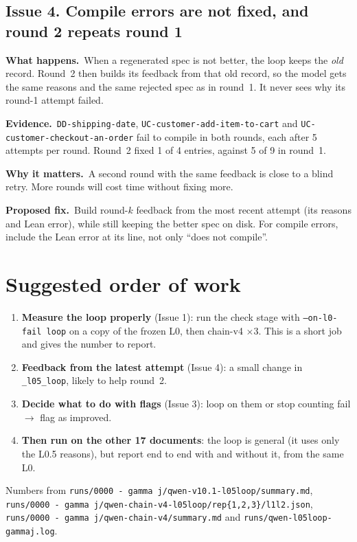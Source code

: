 \documentclass[10pt,a4paper]{article}
\newcommand{\code}[1]{\texttt{\small #1}}
\newcommand{\what}{\par\smallskip\textbf{What happens.}~}
\newcommand{\evidence}{\par\smallskip\textbf{Evidence.}~}
\newcommand{\why}{\par\smallskip\textbf{Why it matters.}~}
\newcommand{\fix}{\par\smallskip\textbf{Proposed fix.}~}
\begin{document}
\subsection*{Issue 4. Compile errors are not fixed, and round 2 repeats round 1}
\what When a regenerated spec is not better, the loop keeps the \emph{old} record. Round~2 then builds its feedback from that
old record, so the model gets the same reasons and the same rejected spec as in round~1. It never sees why its round-1
attempt failed.

\evidence \code{DD-shipping-date}, \code{UC-customer-add-item-to-cart} and \code{UC-customer-checkout-an-order} fail to
compile in both rounds, each after 5 attempts per round. Round~2 fixed 1 of 4 entries, against 5 of 9 in round~1.

\why A second round with the same feedback is close to a blind retry. More rounds will cost time without fixing more.

\fix Build round-$k$ feedback from the most recent attempt (its reasons and Lean error), while still keeping the better spec
on disk. For compile errors, include the Lean error at its line, not only ``does not compile''.

\section{Suggested order of work}
\begin{enumerate}
\item \textbf{Measure the loop properly} (Issue 1): run the check stage with \code{--on-l0-fail loop} on a copy of the frozen L0,
      then chain-v4 $\times$3. This is a short job and gives the number to report.
\item \textbf{Feedback from the latest attempt} (Issue 4): a small change in \code{\_l05\_loop}, likely to help round~2.
\item \textbf{Decide what to do with flags} (Issue 3): loop on them or stop counting fail $\rightarrow$ flag as improved.
\item \textbf{Then run on the other 17 documents}: the loop is general (it uses only the L0.5 reasons), but report end to end
      with and without it, from the same L0.
\end{enumerate}

\vfill
{\footnotesize Numbers from \code{runs/0000 - gamma j/qwen-v10.1-l05loop/summary.md},
\code{runs/0000 - gamma j/qwen-chain-v4-l05loop/rep\{1,2,3\}/l1l2.json}, \code{runs/0000 - gamma j/qwen-chain-v4/summary.md}
and \code{runs/qwen-l05loop-gammaj.log}.}
\end{document}
